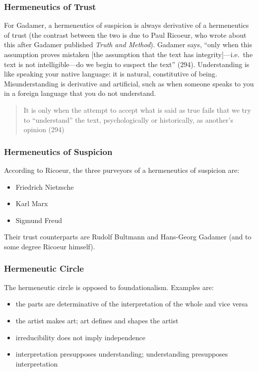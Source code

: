 \documentclass[xcolor=dvipsnames]{beamer}
\begin{document}
\begin{frame}
  \frametitle{Hermeneutics of Trust}
  For Gadamer, a hermeneutics of suspicion is always derivative of a
  hermeneutics of trust (the contrast between the two is due to Paul
  Ricoeur, who wrote about this after Gadamer published \emph{Truth
    and Method}). Gadamer says, ``only when this assumption proves
  mistaken [the assumption that the text has integrity]---i.e.\ the
  text is not intelligible---do we begin to suspect the text'' (294).
  Understanding is like speaking your native language: it is natural,
  constitutive of being. Misunderstanding is derivative and
  artificial, such as when someone speaks to you in a foreign language
  that you do not understand.
  \begin{quote}
    It is only when the attempt to accept what is said as true fails
    that we try to ``understand'' the text, psychologically or
    historically, as another's opinion (294)
  \end{quote}
\end{frame}

\begin{frame}
  \frametitle{Hermeneutics of Suspicion}
  According to Ricoeur, the three purveyors of a hermeneutics of
  suspicion are:
  \begin{itemize}
  \item Friedrich Nietzsche
  \item Karl Marx
  \item Sigmund Freud
  \end{itemize}
Their trust counterparts are Rudolf Bultmann and Hans-Georg Gadamer
(and to some degree Ricoeur himself). 
\end{frame}

\begin{frame}
  \frametitle{Hermeneutic Circle}
  The hermeneutic circle is opposed to foundationalism. Examples are:
  \begin{itemize}
  \item the parts are determinative of the interpretation of the whole
    and vice versa
  \item the artist makes art; art defines and shapes the artist
  \item irreducibility does not imply independence
  \item interpretation presupposes understanding; understanding
    presupposes interpretation
  \end{itemize}
\end{frame}
\end{document}
